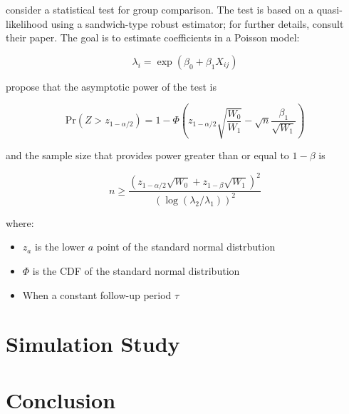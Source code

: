 \documentclass{article}
\begin{document}
\cite{igeta2018} consider a statistical test for group comparison. The test is
based on a quasi-likelihood using a sandwich-type robust estimator; for further
details, consult their paper. The goal is
to estimate coefficients in a Poisson model:

$$
\lambda_i = \exp{(\beta_0 + \beta_1 X_{ij})}
$$

\cite{igeta2018} propose that the asymptotic power of the test is

\begin{equation}
\mathrm{Pr} \left( Z > z_{1 - \alpha/ 2} \right) 
=
1 - \Phi 
\left(
z_{1 - \alpha / 2}
\sqrt{\frac{W_0}{W_1}}
-
\sqrt{n}
\frac{\beta_1}{\sqrt{W_1}}
\right)
\end{equation}

and the sample size that provides power greater than or equal to 
$1 - \beta$ is

\begin{equation}
n \geq \frac{(z_{1 - \alpha / 2} \sqrt{W_0} + z_{1 - \beta}
\sqrt{W_1})^2}{\left( \log (\lambda_2 / \lambda_1 ) \right)^2}
\end{equation}

where:

\begin{itemize}
\item $z_a$ is the lower $a$ point of the standard normal distrbution
\item $\Phi$ is the CDF of the standard normal distribution
\item When a constant follow-up period $\tau$ 
\end{itemize}


\section{Simulation Study}

\section{Conclusion}

\printbibliography[heading=bibnumbered]
\end{document}

